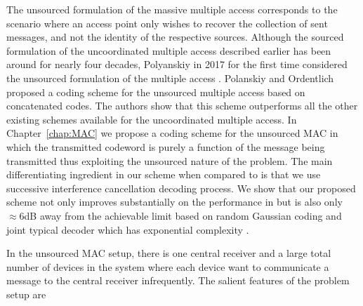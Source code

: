 The unsourced formulation of the massive multiple access corresponds to the scenario where an access point only wishes to recover the collection of sent messages, and not the identity of the respective sources.  Although the sourced formulation of the uncoordinated multiple access described earlier has been around for nearly four decades, Polyanskiy in 2017 for the first time considered the unsourced formulation of the multiple access \cite{polyanskiy2017perspective}. Polanskiy and Ordentlich \cite{ordentlich2017low} proposed a coding scheme for the unsourced multiple access based on concatenated codes. The authors show that this scheme outperforms all the other existing schemes available for the uncoordinated multiple access. In Chapter~\ref{chap:MAC} we propose a coding scheme for the unsourced MAC in which the transmitted codeword is purely a function of the message being transmitted thus exploiting  the unsourced nature of the problem. The main differentiating ingredient in our scheme when compared to \cite{ordentlich2017low} is that we use successive interference cancellation decoding process. We show that our proposed scheme not only improves substantially on the performance in \cite{ordentlich2017low} but is also only $\approx 6$dB away from the achievable limit based on random Gaussian coding and joint typical decoder which has exponential complexity \cite{polyanskiy2017perspective}. 



\iflonger
In the unsourced MAC setup, there is one central receiver and a large total number of devices in the system where each device want to communicate a message to the central receiver infrequently. The salient features of the problem setup are 

